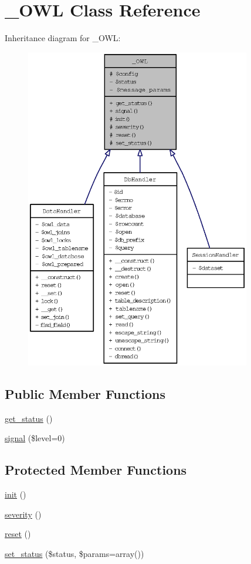 \hypertarget{class__OWL}{
\section{\_\-OWL Class Reference}
\label{class__OWL}
}
Inheritance diagram for \_\-OWL:\nopagebreak
\begin{figure}[H]
\begin{center}
\leavevmode
\includegraphics[height=400pt]{class__OWL__inherit__graph}
\end{center}
\end{figure}
\subsection*{Public Member Functions}
\begin{CompactItemize}
\item 
\hyperlink{class__OWL_99ec771fa2c5c279f80152cc09e489a8}{get\_\-status} ()
\item 
\hyperlink{class__OWL_61c04b80fe17e2f1e339a6d6a89e45f3}{signal} (\$level=0)
\end{CompactItemize}
\subsection*{Protected Member Functions}
\begin{CompactItemize}
\item 
\hyperlink{class__OWL_e0ef3ded56e8a6b34b6461e5a721cd3e}{init} ()
\item 
\hyperlink{class__OWL_5b88d497ccf2305fa411b9bd3f4bfe6f}{severity} ()
\item 
\hyperlink{class__OWL_2f2a042bcf31965194c03033df0edc9b}{reset} ()
\item 
\hyperlink{class__OWL_ea912d0ede9b3c2a69b79072d94d4787}{set\_\-status} (\$status, \$params=array())
\end{CompactItemize}
